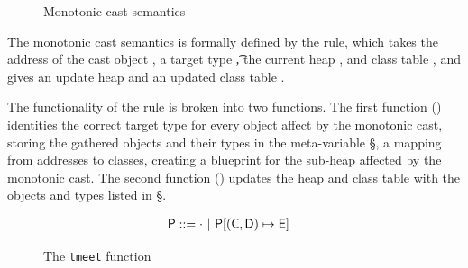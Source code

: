 \documentclass[a4paper,USenglish]{tex/lipics-v2016}
\begin{document}
\begin{figure}
\begin{mathpar}
\end{mathpar}
\caption{Monotonic cast semantics}
\label{fig:mono_sem}
\end{figure}

The monotonic cast semantics is formally defined by the  rule, 
which takes the address of the cast object \a, a target type \t, the current heap \s, 
and class table \K, and gives an update heap \sp and an updated class table \Kp.

The functionality of the  rule is broken into two functions.
The first function () identities the correct target type for every object affect by
the monotonic cast, storing the gathered objects and their types in the meta-variable \S, 
a mapping from addresses to classes, creating a blueprint for the sub-heap affected 
by the monotonic cast. The second function () updates the heap and class table with the
objects and types listed in \S.

\begin{figure}[!ht]
\opdef{
  $\tmeet{\t}{\tp}\P\K = \tpp\,\Kp$
}{
}
\begin{align*}
\P &::= \cdot \B \Map\P{\Bind{(\C,\D)}\E}
\end{align*}
\begin{mathpar}




\end{mathpar}
\caption{The \texttt{tmeet} function}
\label{fig:tmeet_fun}
\end{figure}
\end{document}
